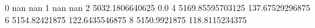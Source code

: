 0 nan nan
1 nan nan
2 5032.1806640625 0.0
4 5169.85595703125 137.67529296875
6 5154.82421875 122.6435546875
8 5150.9921875 118.8115234375
